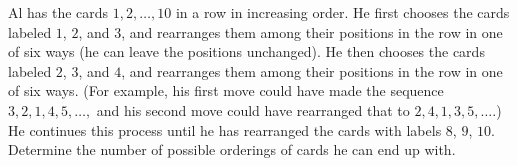 Al has the cards $1,2,\dots,10$ in a row in increasing order. He first chooses the cards labeled $1$, $2$, and $3$, and rearranges them among their positions in the row in one of six ways (he can leave the positions unchanged). He then chooses the cards labeled $2$, $3$, and $4$, and rearranges them among their positions in the row in one of six ways. (For example, his first move could have made the sequence $3,2,1,4,5,\dots,$ and his second move could have rearranged that to $2,4,1,3,5,\dots$.) He continues this process until he has rearranged the cards with labels $8$, $9$, $10$. Determine the number of possible orderings of cards he can end up with.
